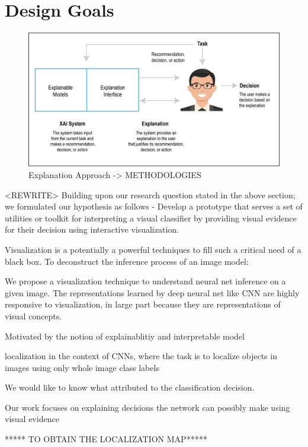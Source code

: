 \section{Design Goals}

\begin{figure}[htbp]
\centering
\includegraphics[width=1\textwidth]{images/xai-1-01.png}
\caption{Explanation Approach -> METHODOLOGIES}
\label{fig:explanation-approach}
\end{figure}

<REWRITE> Building upon our research question stated in the above section; we formulated our hypothesis as follows -  Develop a prototype that serves a set of utilities or toolkit for interpreting a visual classifier by providing visual evidence for their decision using interactive visualization.

Visualization is a potentially a powerful techniques to fill such a critical need of a black box. To deconstruct the inference process of an image model: 

We propose a visualization technique to understand neural net inference on a given image.  The representations learned by deep neural net like CNN are highly responsive to visualization, in large part because they are representations of visual concepts.

Motivated by the notion of explainablitiy and interpretable model 

localization in the context of CNNs, where the task is to localize objects in images using only whole image class labels

We would like to know what attributed to the classification decision.

Our work focuses on explaining decisions the network can possibly make using visual evidence 

***** TO OBTAIN THE LOCALIZATION MAP*****

